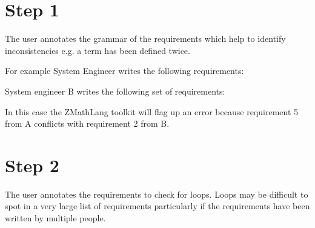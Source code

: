 \section{Step 1}
The user annotates the grammar of the requirements which help to identify
inconsistencies e.g. a term has been defined twice. 

For example System Engineer writes the following requirements:

\noindent{}

System engineer B writes the following set of requirements:

\noindent{}

In this case the ZMathLang toolkit will flag up an error because requirement 5
from A conflicts with requirement 2 from B.

\section{Step 2}

The user annotates the requirements to check for loops. Loops may be difficult
to spot in a very large list of requirements particularly if the requirements have
been written by multiple people.

